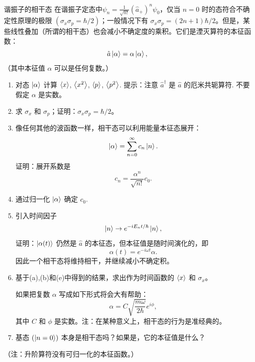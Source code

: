 \begin{problembox}{谐振子的相干态}
	在谐振子定态中\(\displaystyle {\psi _n} = \frac{1}{{\sqrt {n!} }}{\left( {{{\hat a}_ + }} \right)^n}{\psi _0}\)，仅当 $n=0$ 时的态符合不确定性原理的极限 $(\sigma_{x}\sigma_{p}=\hbar/2)$；一般情况下有 $\sigma_{x}\sigma_{p}=(2n+1)\hbar/2$。但是，某些线性叠加（所谓的相干态）也会减小不确定度的乘积。它们是湮灭算符的本征函数：
	\[
	\hat{a}\ket{\alpha}=\alpha\ket{\alpha},
	\]
	（其中本征值 $\alpha$ 可以是任何复数。）
	\begin{enumerate}
		\item[(a)] 对态 $\ket{\alpha}$ 计算 $\expval{x}$, $\expval{x^{2}}$, $\expval{p}$, $\expval{p^{2}}$. 提示：注意 $\hat{a}^\dagger$ 是 $\hat{a}$ 的厄米共轭算符. 不要假定 $\alpha$ 是实数。
		\item[(b)] 求 $\sigma_{x}$ 和 $\sigma_{p}$；证明：$\sigma_{x}\sigma_{p}=\hbar/2$。
		\item[(c)] 像任何其他的波函数一样，相干态可以利用能量本征态展开：
		\[
		\ket{\alpha}=\sum_{n=0}^{\infty}c_{n}\ket{n}.
		\]
		证明：展开系数是
		\[
		c_{n}=\frac{\alpha^{n}}{\sqrt{n!}}c_{0}.
		\]
		\item[(d)] 通过归一化 $\ket{\alpha}$ 确定 $c_{0}$.
		\item[(e)] 引入时间因子
		\[
		\ket{n}\rightarrow e^{-iE_{n}t/\hbar}\ket{n},
		\]
		证明：$\ket{\alpha(t)}$ 仍然是 $\hat{a}$ 的本征态，但本征值是随时间演化的，即
		\[
		\alpha(t)=e^{-i\omega t}\alpha.
		\]
		因此一个相干态将维持相干，并继续减小不确定积。
		\item[(f)] 基于(a),(b)和(e)中得到的结果，求出作为时间函数的 $\expval{x}$ 和 $\sigma_{x}$。
		
		如果把复数 $\alpha$ 写成如下形式将会大有帮助：
		\[
		\alpha=C\sqrt{\frac{m\omega}{2\hbar}}e^{i\phi},
		\]
		其中 $C$ 和 $\phi$ 是实数。注：在某种意义上，相干态的行为是准经典的。
		\item[(g)] 基态 $(\ket{n=0})$ 本身是相干态吗？如果是，它的本征值是什么？
	\end{enumerate}
	（注：升阶算符没有可归一化的本征函数。）
\end{problembox}

